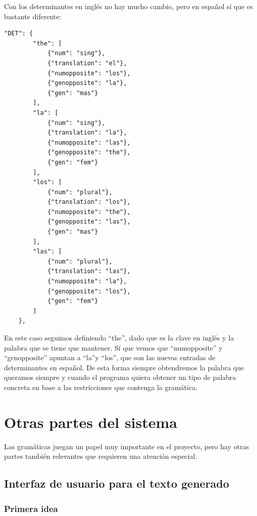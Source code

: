 Con los determinantes en inglés no hay mucho cambio, pero en español sí que es bastante diferente:

\begin{lstlisting}[style=json]
"DET": {
        "the": [
            {"num": "sing"},
            {"translation": "el"},
            {"numopposite": "los"},
            {"genopposite": "la"},
            {"gen": "mas"}
        ],
        "la": [
            {"num": "sing"},
            {"translation": "la"},
            {"numopposite": "las"},
            {"genopposite": "the"},
            {"gen": "fem"}
        ],
        "los": [
            {"num": "plural"},
            {"translation": "los"},
            {"numopposite": "the"},
            {"genopposite": "las"},
            {"gen": "mas"}
        ],
        "las": [
            {"num": "plural"},
            {"translation": "las"},
            {"numopposite": "la"},
            {"genopposite": "los"},
            {"gen": "fem"}
        ]
    },
\end{lstlisting}

En este caso seguimos definiendo ``the'', dado que es la clave en inglés y la palabra que se tiene que mantener. Sí que vemos que ``numopposite'' y ``genopposite'' apuntan a ``la''y ``los'', que son las nuevas entradas de determinantes en español. De esta forma siempre obtendremos la palabra que queramos siempre y cuando el programa quiera obtener un tipo de palabra concreta en base a las restricciones que contenga la gramática.

\section{Otras partes del sistema}

Las gramáticas juegan un papel muy importante en el proyecto, pero hay otras partes también relevantes que requieren una atención especial.

\subsection{Interfaz de usuario para el texto generado}

\subsubsection{Primera idea}

